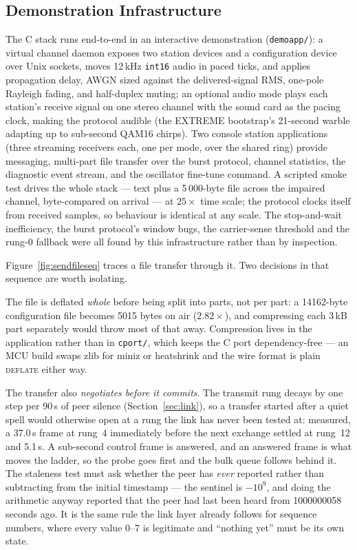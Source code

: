 \subsection{Demonstration Infrastructure}
\label{sec:cport_demo}

The C stack runs end-to-end in an interactive demonstration
(\texttt{demoapp/}): a virtual channel daemon exposes two station
devices and a configuration device over Unix sockets, moves 12\,kHz
\texttt{int16} audio in paced ticks, and applies propagation delay,
AWGN sized against the delivered-signal RMS, one-pole Rayleigh fading,
and half-duplex muting; an optional audio mode plays each station's
receive signal on one stereo channel with the sound card as the pacing
clock, making the protocol audible (the EXTREME bootstrap's 21-second
warble adapting up to sub-second QAM16 chirps).  Two console station
applications (three streaming receivers each, one per mode, over the
shared ring) provide messaging, multi-part file transfer over the
burst protocol, channel statistics, the diagnostic event stream, and
the oscillator fine-tune command.  A scripted smoke test drives the
whole stack --- text plus a 5\,000-byte file across the impaired
channel, byte-compared on arrival --- at $25\times$ time scale; the
protocol clocks itself from received samples, so behaviour is
identical at any scale.  The stop-and-wait inefficiency, the burst
protocol's window bugs, the carrier-sense threshold and the rung-0
fallback were all found by this infrastructure rather than by
inspection.

Figure~\ref{fig:sendfileseq} traces a file transfer through it.  Two
decisions in that sequence are worth isolating.

The file is deflated \emph{whole} before being split into parts, not
per part: a 14162-byte configuration file becomes 5015 bytes on air
($2.82\times$), and compressing each 3\,kB part separately would throw
most of that away.  Compression lives in the application rather than in
\texttt{cport/}, which keeps the C port dependency-free --- an MCU
build swaps zlib for miniz or heatshrink and the wire format is plain
\textsc{deflate} either way.

The transfer also \emph{negotiates before it commits}.  The transmit
rung decays by one step per 90\,s of peer silence
(Section~\ref{sec:link}), so a transfer started after a quiet
spell would otherwise open at a rung the link has never been tested at:
measured, a 37.0\,s frame at rung~4 immediately before the next
exchange settled at rung~12 and 5.1\,s.  A sub-second control frame is
answered, and an answered frame is what moves the ladder, so the probe
goes first and the bulk queue follows behind it.  The staleness test
must ask whether the peer has \emph{ever} reported rather than
subtracting from the initial timestamp --- the sentinel is
$-10^{9}$, and doing the arithmetic anyway reported that the peer had
last been heard from 1000000058\,seconds ago.  It is the same rule the
link layer already follows for sequence numbers, where every value
0--7 is legitimate and ``nothing yet'' must be its own state.

